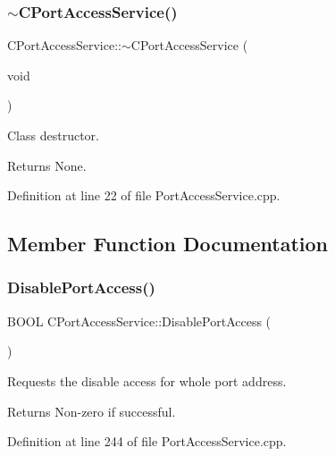 \subsubsection{\texorpdfstring{$\sim$CPortAccessService()}{~CPortAccessService()}}
{\footnotesize\ttfamily C\+Port\+Access\+Service\+::$\sim$\+C\+Port\+Access\+Service (\begin{DoxyParamCaption}\item[{void}]{ }\end{DoxyParamCaption})}



Class destructor. 

\begin{DoxyReturn}{Returns}
None. 
\end{DoxyReturn}


Definition at line 22 of file Port\+Access\+Service.\+cpp.



\subsection{Member Function Documentation}
\mbox{\label{class_c_port_access_service_af92909af5b653f777abc4c7d89692f47}} 
\subsubsection{\texorpdfstring{DisablePortAccess()}{DisablePortAccess()}}
{\footnotesize\ttfamily B\+O\+OL C\+Port\+Access\+Service\+::\+Disable\+Port\+Access (\begin{DoxyParamCaption}{ }\end{DoxyParamCaption})}



Requests the disable access for whole port address. 

\begin{DoxyReturn}{Returns}
Non-\/zero if successful. 
\end{DoxyReturn}


Definition at line 244 of file Port\+Access\+Service.\+cpp.

\mbox{\label{class_c_port_access_service_aa0b4f72031c3b169bda30fc649c570c2}} 
